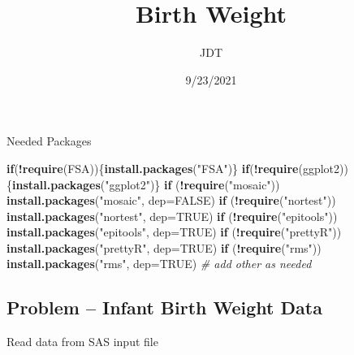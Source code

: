 \documentclass[]{article}
\title{Birth Weight}
\author{JDT}
\date{9/23/2021}
\newenvironment{Shaded}{\begin{snugshade}}{\end{snugshade}}
\newcommand{\KeywordTok}[1]{\textcolor[rgb]{0.13,0.29,0.53}{\textbf{#1}}}
\newcommand{\DataTypeTok}[1]{\textcolor[rgb]{0.13,0.29,0.53}{#1}}
\newcommand{\StringTok}[1]{\textcolor[rgb]{0.31,0.60,0.02}{#1}}
\newcommand{\CommentTok}[1]{\textcolor[rgb]{0.56,0.35,0.01}{\textit{#1}}}
\newcommand{\OtherTok}[1]{\textcolor[rgb]{0.56,0.35,0.01}{#1}}
\newcommand{\ControlFlowTok}[1]{\textcolor[rgb]{0.13,0.29,0.53}{\textbf{#1}}}
\newcommand{\OperatorTok}[1]{\textcolor[rgb]{0.81,0.36,0.00}{\textbf{#1}}}
\newcommand{\NormalTok}[1]{#1}
\begin{document}
\maketitle

Needed Packages

\begin{Shaded}
\begin{Highlighting}[]
\ControlFlowTok{if}\NormalTok{(}\OperatorTok{!}\KeywordTok{require}\NormalTok{(FSA))\{}\KeywordTok{install.packages}\NormalTok{(}\StringTok{"FSA"}\NormalTok{)\}}
\ControlFlowTok{if}\NormalTok{(}\OperatorTok{!}\KeywordTok{require}\NormalTok{(ggplot2))\{}\KeywordTok{install.packages}\NormalTok{(}\StringTok{"ggplot2"}\NormalTok{)\}}
\ControlFlowTok{if}\NormalTok{ (}\OperatorTok{!}\KeywordTok{require}\NormalTok{(}\StringTok{"mosaic"}\NormalTok{)) }\KeywordTok{install.packages}\NormalTok{(}\StringTok{"mosaic"}\NormalTok{, }\DataTypeTok{dep=}\OtherTok{FALSE}\NormalTok{)}
\ControlFlowTok{if}\NormalTok{ (}\OperatorTok{!}\KeywordTok{require}\NormalTok{(}\StringTok{"nortest"}\NormalTok{)) }\KeywordTok{install.packages}\NormalTok{(}\StringTok{"nortest"}\NormalTok{, }\DataTypeTok{dep=}\OtherTok{TRUE}\NormalTok{)}
\ControlFlowTok{if}\NormalTok{ (}\OperatorTok{!}\KeywordTok{require}\NormalTok{(}\StringTok{"epitools"}\NormalTok{)) }\KeywordTok{install.packages}\NormalTok{(}\StringTok{"epitools"}\NormalTok{, }\DataTypeTok{dep=}\OtherTok{TRUE}\NormalTok{)}
\ControlFlowTok{if}\NormalTok{ (}\OperatorTok{!}\KeywordTok{require}\NormalTok{(}\StringTok{"prettyR"}\NormalTok{)) }\KeywordTok{install.packages}\NormalTok{(}\StringTok{"prettyR"}\NormalTok{, }\DataTypeTok{dep=}\OtherTok{TRUE}\NormalTok{)}
\ControlFlowTok{if}\NormalTok{ (}\OperatorTok{!}\KeywordTok{require}\NormalTok{(}\StringTok{"rms"}\NormalTok{)) }\KeywordTok{install.packages}\NormalTok{(}\StringTok{"rms"}\NormalTok{, }\DataTypeTok{dep=}\OtherTok{TRUE}\NormalTok{)}
\CommentTok{# add other as needed}
\end{Highlighting}
\end{Shaded}

\subsection{Problem -- Infant Birth Weight
Data}\label{problem-infant-birth-weight-data}

Read data from SAS input file
\end{document}

